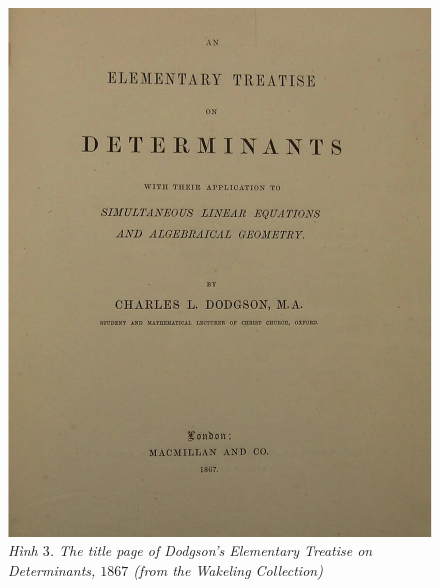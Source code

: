 \begin{multicols}{2}
	\begin{figure}[H]
		\vspace*{-5pt}
		\centering
		\captionsetup{labelformat= empty, justification=centering}
		\includegraphics[width= 1\linewidth]{3}
		\caption{\small\textit{\color{quantoan}Hình $3$. The title page of Dodgson’s Elementary Treatise on Determinants, $1867$ (from the Wakeling Collection)}}
		\vspace*{-10pt}
	\end{figure}

\end{multicols}
